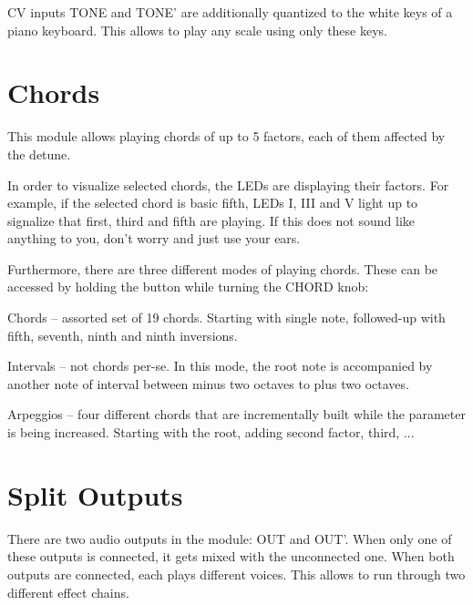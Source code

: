 \documentclass[10pt,nofoldmark,nocombine]{leaflet} %
\newenvironment{packed_enumerate_i}{
\begin{enumerate}[I]
  \setlength{\itemsep}{1pt}
  \setlength{\parskip}{0pt}
  \setlength{\parsep}{0pt}
}{\end{enumerate}}
\begin{document}

CV inputs TONE and TONE' are additionally quantized to the white keys of a piano keyboard. This allows to play any scale using only these keys.

\section{Chords}

This module allows playing chords of up to 5 factors, each of them affected by the detune.

In order to visualize selected chords, the LEDs are displaying their factors. For example, if the selected chord is basic fifth, LEDs I, III and V light up to signalize that first, third and fifth are playing. If this does not sound like anything to you, don't worry and just use your ears.

Furthermore, there are three different modes of playing chords. These can be accessed by holding the button while turning the CHORD knob:

\begin{packed_enumerate_i}
  \item Chords -- assorted set of 19 chords. Starting with single note, followed-up with fifth, seventh, ninth and ninth inversions.
  \item Intervals -- not chords per-se. In this mode, the root note is accompanied by another note of interval between minus two octaves to plus two octaves.
  \item Arpeggios -- four different chords that are incrementally built while the parameter is being increased. Starting with the root, adding second factor, third, ...
\end{packed_enumerate_i}


\section{Split Outputs}

There are two audio outputs in the module: OUT and OUT'. When only one of these outputs is connected, it gets mixed with the unconnected one. When both outputs are connected, each plays different voices. This allows to run through two different effect chains.
\end{document}
